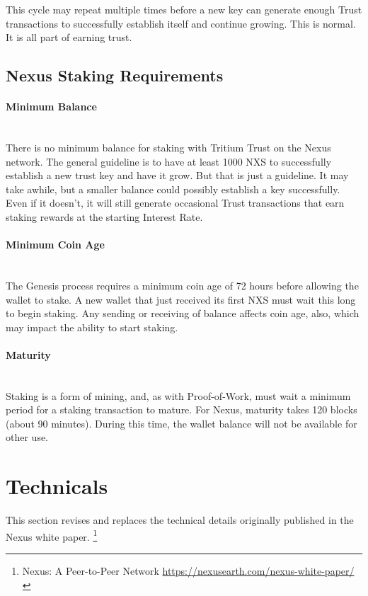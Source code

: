 \documentclass[11pt]{article}
\begin{document}
\noindent This cycle may repeat multiple times before a new key can generate enough Trust transactions to successfully establish itself and continue growing. This is normal. It is all part of earning trust.\\

\subsection{Nexus Staking Requirements}

\paragraph{Minimum Balance} ~\\
There is no minimum balance for staking with Tritium Trust on the Nexus network. The general guideline is to have at least 1000 NXS to successfully establish a new trust key and have it grow. But that is just a guideline. It may take awhile, but a smaller balance could possibly establish a key successfully. Even if it doesn’t, it will still generate occasional Trust transactions that earn staking rewards at the starting Interest Rate.

\paragraph{Minimum Coin Age} ~\\
The Genesis process requires a minimum coin age of 72 hours before allowing the wallet to stake. A new wallet that just received its first NXS must wait this long to begin staking. Any sending or receiving of balance affects coin age, also, which may impact the ability to start staking. 

\paragraph{Maturity} ~\\
Staking is a form of mining, and, as with Proof-of-Work, must wait a minimum period for a staking transaction to mature. For Nexus, maturity takes 120 blocks (about 90 minutes). During this time, the wallet balance will not be available for other use. 

\bigskip

\section{Technicals}
This section revises and replaces the technical details originally published in the Nexus white paper. \footnote{Nexus: A Peer-to-Peer Network \url{https://nexusearth.com/nexus-white-paper/}}
\end{document}
